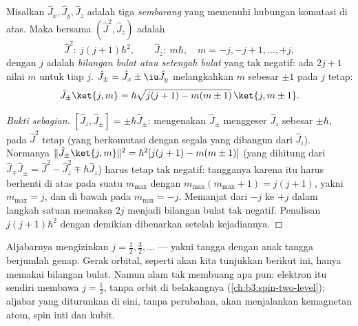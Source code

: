 \begin{theorem}\label{thm:b3:quantum-angular-momentum:spectrum}
Misalkan $\hat J_x, \hat J_y, \hat J_z$ adalah tiga 
\emph{sembarang} yang memenuhi hubungan komutasi di atas. Maka  bersama $(\hat J^2, \hat J_z)$ adalah
\[
\hat J^2:\ j(j+1)\hbar^2 , \qquad
\hat J_z:\ m\hbar , \quad m = -j, -j+1, \dots, +j ,
\]
dengan $j$ adalah \emph{bilangan bulat atau setengah bulat} yang tak
negatif: ada $2j + 1$ nilai $m$ untuk tiap $j$. 
$\hat J_\pm = \hat
J_x \pm \iu\hat J_y$ melangkahkan $m$ sebesar $\pm1$ pada $j$ tetap:
\[
\hat J_\pm\ket{j,m} = \hbar\sqrt{j(j+1) - m(m\pm1)}\,\ket{j,m\pm1} .
\]
\end{theorem}

\begin{proof}[Bukti sebagian]
$[\hat J_z, \hat J_\pm] = \pm\hbar\hat J_\pm$: mengenakan $\hat
J_\pm$ menggeser  $\hat J_z$ sebesar $\pm\hbar$, pada
$\hat J^2$ tetap (yang berkomutasi dengan segala yang dibangun dari $\hat
J_i$). Normanya $\|\hat J_\pm\ket{j,m}\|^2 = \hbar^2[j(j+1) -
m(m\pm1)]$ (yang dihitung dari $\hat J_\mp\hat J_\pm = \hat J^2 - \hat
J_z^2 \mp \hbar\hat J_z$) harus tetap tak negatif: tangganya karena itu
harus berhenti di atas pada suatu $m_{\max}$ dengan $m_{\max}(m_{\max}+1) =
j(j+1)$, yakni $m_{\max} = j$, dan di bawah pada $m_{\min} = -j$.
Memanjat dari $-j$ ke $+j$ dalam langkah satuan memaksa $2j$ menjadi
bilangan bulat tak negatif. Penulisan  $j(j+1)\hbar^2$
dengan demikian dibenarkan setelah kejadiannya.
\end{proof}

\begin{remark}\label{rem:b3:quantum-angular-momentum:halfinteger}
Aljabarnya mengizinkan $j = \tfrac12, \tfrac32, \dots$ --- yakni tangga
dengan anak tangga berjumlah genap. Gerak orbital, seperti akan kita
tunjukkan berikut ini, hanya memakai bilangan bulat. Namun alam tak
membuang apa pun: elektron itu sendiri membawa $j = \tfrac12$, tanpa
orbit di belakangnya (\cref{ch:b3:spin-two-level}); aljabar yang
diturunkan di sini, tanpa perubahan, akan menjalankan kemagnetan atom,
spin inti dan kubit.
\end{remark}

